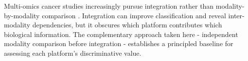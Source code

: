Multi-omics cancer studies increasingly pursue integration rather than modality-by-modality comparison \parencite{Hoadley2018, Picard2021, Nicora2020, Argelaguet2020}. Integration can improve classification and reveal inter-modality dependencies, but it obscures which platform contributes which biological information. The complementary approach taken here - independent modality
comparison before integration - establishes a principled baseline for assessing each platform's discriminative value.
